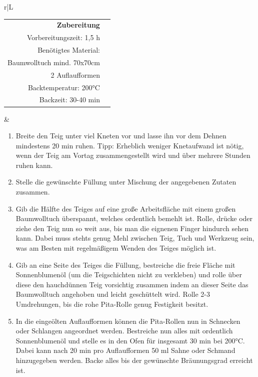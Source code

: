 \documentclass[a4paper, 12pt]{scrbook} 								%
\numberwithin{equation}{section} 									%
\begin{document}
				\begin{tabularx}{\textwidth}{r|L}
			
			
				\begin{tabular}[t]{rr}
					\textbf{Zubereitung}	\\
					Vorbereitungszeit: 1,5 h	\\
					Benötigtes Material: \\ Baumwolltuch mind. 70x70cm \\ 2 Auflaufformen \\
					Backtemperatur: 200°C \\
					Backzeit: 30-40 min \\
				\end{tabular}			&	\begin{enumerate}[]
												\item Breite den Teig unter viel Kneten vor und lasse ihn vor dem Dehnen mindestens 20 min ruhen. Tipp: Erheblich weniger Knetaufwand ist nötig, wenn der Teig am Vortag zusammengestellt wird und über mehrere Stunden ruhen kann.
												\item Stelle die gewünschte Füllung unter Mischung der angegebenen Zutaten zusammen.
												\item Gib die Hälfte des Teiges auf eine große Arbeitsfläche mit einem großen Baumwolltuch überspannt, welches ordentlich bemehlt ist. Rolle, drücke oder ziehe den Teig nun so weit aus, bis man die eignenen Finger hindurch sehen kann. Dabei muss stehts genug Mehl zwischen Teig, Tuch und Werkzeug sein, was am Besten mit regelmäßigem Wenden des Teiges möglich ist.
												\item Gib an eine Seite des Teiges die Füllung, bestreiche die freie Fläche mit  Sonnenblumenöl (um die Teigschichten nicht zu verkleben) und rolle über diese den hauchdünnen Teig vorsichtig zusammen indem an dieser Seite das Baumwolltuch angehoben und leicht geschüttelt wird. Rolle 2-3 Umdrehungen, bis die rohe Pita-Rolle genug Festigkeit besitzt. 
												\item In die eingeölten Auflaufformen können die Pita-Rollen nun in Schnecken oder Schlangen angeordnet werden. Bestreiche nun alles mit ordentlich Sonnenblumenöl und stelle es in den Ofen für insgesamt 30 min bei 200°C. Dabei kann nach 20 min pro Auflaufformen 50 ml Sahne oder Schmand hinzugegeben werden. Backe alles bis der gewünschte Bräunungsgrad erreicht ist.
											\end{enumerate}	\\
			\end{tabularx}
\end{document}
